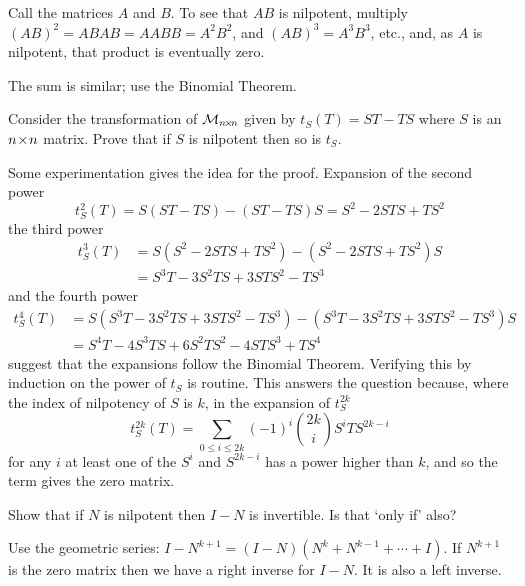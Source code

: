 \begin{exercises}
\begin{answer}
      Call the matrices \( A \) and \( B \).
      To see that \( AB \) is nilpotent, multiply
      $
         (AB)^2=ABAB=AABB=A^2B^2$,
      and
         $(AB)^3=A^3B^3$, etc.,
      and, as \( A \) is nilpotent, that product is eventually zero.

      The sum is similar; use the Binomial Theorem.  
     \end{answer}
  \item 
    Consider the transformation of \( \mathcal{M}_{n \! \times \! n} \) given
    by \( t_S(T)=ST-TS \) where \( S \) is an \( n \! \times \! n \) matrix.
    Prove that if \( S \) is nilpotent then so is \( t_S \).
    \begin{answer}
      Some experimentation gives the idea for the proof.
      Expansion of the second power
      \begin{equation*}
        t^2_S(T)=S(ST-TS)-(ST-TS)S=S^2-2STS+TS^2
      \end{equation*}
      the third power
      \begin{align*}
        t^3_S(T)
          &=S(S^2-2STS+TS^2)-(S^2-2STS+TS^2)S  \\
          &=S^3T-3S^2TS+3STS^2-TS^3
      \end{align*}
      and the fourth power
      \begin{align*}
        t^4_S(T)
          &=S(S^3T-3S^2TS+3STS^2-TS^3)-(S^3T-3S^2TS+3STS^2-TS^3)S  \\
          &=S^4T-4S^3TS+6S^2TS^2-4STS^3+TS^4
      \end{align*}
      suggest that the expansions follow the Binomial Theorem.
      Verifying this by induction on the power of $t_S$ is routine.
      This answers the question because, where the index of nilpotency of 
      $S$ is $k$, in the expansion of $t^{2k}_S$  
      \begin{equation*}
        t^{2k}_S(T)=\sum_{0\leq i\leq 2k}(-1)^i\binom{2k}{i} S^iTS^{2k-i}
      \end{equation*}
      for any $i$ at least one of the $S^i$ and $S^{2k-i}$ 
      has a power higher than $k$, and so the term gives the zero matrix. 
    \end{answer}
  \item 
    Show that if \( N \) is nilpotent then \( I-N \) is
    invertible.
    Is that `only if' also?
    \begin{answer}
      Use the geometric series:
      $
         I-N^{k+1}=(I-N)(N^k+N^{k-1}+\cdots+I)
      $.
      If \( N^{k+1} \) is the zero matrix then we have a right inverse for
      \( I-N \).
      It is also a left inverse.


\end{answer}
\end{exercises}
